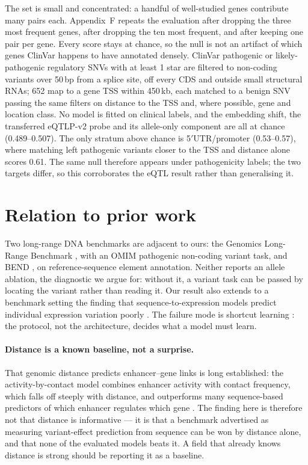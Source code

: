 The set is small and concentrated: a handful of well-studied genes contribute
many pairs each. Appendix~F repeats the evaluation after dropping the three most
frequent genes, after dropping the ten most frequent, and after keeping one pair
per gene. Every score stays at chance, so the null is not an artifact of which
genes ClinVar happens to have annotated densely.
\else
ClinVar \citep{landrum2025clinvar} pathogenic or likely-pathogenic regulatory
SNVs with at least 1 star are filtered to non-coding variants over 50\,bp from a
splice site, off every CDS and outside small structural RNAs; 652 map to a gene
TSS within 450\,kb, each matched to a benign SNV passing the same filters on
distance to the TSS and, where possible, gene and location class. No model is
fitted on clinical labels, and the embedding shift, the transferred eQTLP-v2
probe and its allele-only component are all at chance (0.489--0.507). The only
stratum above chance is 5$'$UTR/promoter (0.53--0.57), where matching left
pathogenic variants closer to the TSS and distance alone scores 0.61. The same
null therefore appears under pathogenicity labels; the two targets differ, so
this corroborates the eQTL result rather than generalising it.
\fi

\section{Relation to prior work}

Two long-range DNA benchmarks are adjacent to ours: the Genomics Long-Range
Benchmark \citep{kao2024lrb}, with an OMIM pathogenic non-coding variant task,
and BEND \citep{marin2024bend}, on reference-sequence element annotation. Neither
reports an allele ablation, the diagnostic we argue for: without it, a variant
task can be passed by locating the variant rather than reading it. Our result
also extends to a benchmark setting the finding that sequence-to-expression
models predict individual expression variation poorly
\citep{sasse2023benchmarking,huang2023personal}. The failure mode is shortcut
learning \citep{geirhos2020shortcut}: the protocol, not the architecture, decides
what a model must learn.

\ifdefined\RECOMB
\paragraph{Distance is a known baseline, not a surprise.} That genomic distance
predicts enhancer--gene links is long established: the activity-by-contact model
combines enhancer activity with contact frequency, which falls off steeply with
distance, and outperforms many sequence-based predictors of which enhancer
regulates which gene \citep{fulco2019abc}. The finding here is therefore not that
distance is informative --- it is that a benchmark advertised as measuring
variant-effect prediction from sequence can be won by distance alone, and that
none of the evaluated models beats it. A field that already knows distance is
strong should be reporting it as a baseline.

